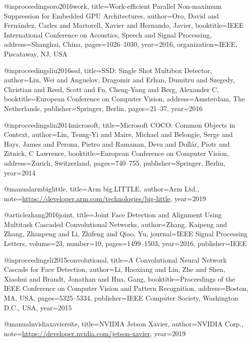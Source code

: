 
@inproceedings{oro2016work,
  title={{{Work-efficient Parallel Non-maximum Suppression for Embedded GPU Architectures}}},
  author={Oro, David and Fern{\'a}ndez, Carles and Martorell, Xavier and Hernando, Javier},
  booktitle={IEEE International Conference on Acoustics, Speech and Signal Processing},
  address={Shanghai, China},
  pages={1026--1030},
  year={2016},
  organization={IEEE, Piscataway, NJ, USA}
}

@inproceedings{liu2016ssd,
  title={{{SSD: Single Shot Multibox Detector}}},
  author={Liu, Wei and Anguelov, Dragomir and Erhan, Dumitru and Szegedy, Christian and Reed, Scott and Fu, Cheng-Yang and Berg, Alexander C},
  booktitle={European Conference on Computer Vision},
  address={Amsterdam, The Netherlands},
  publisher={Springer, Berlin},
  pages={21--37},
  year={2016}
}

@inproceedings{lin2014microsoft,
  title={{{Microsoft COCO: Common Objects in Context}}},
  author={Lin, Tsung-Yi and Maire, Michael and Belongie, Serge and Hays, James and Perona, Pietro and Ramanan, Deva and Doll{\'a}r, Piotr and Zitnick, C Lawrence},
  booktitle={European Conference on Computer Vision},
  address={Zurich, Switzerland},
  pages={740--755},
  publisher={Springer, Berlin},
  year={2014}
}

@manual{armbiglittle,
  title={{{Arm big.LITTLE}}},
  author={{Arm Ltd.}},
  note={\url{https://developer.arm.com/technologies/big-little}},
  year={2019}
}

@article{zhang2016joint,
  title={{{Joint Face Detection and Alignment Using Multitask Cascaded Convolutional Networks}}},
  author={Zhang, Kaipeng and Zhang, Zhanpeng and Li, Zhifeng and Qiao, Yu},
  journal={IEEE Signal Processing Letters},
  volume={23},
  number={10},
  pages={1499--1503},
  year={2016},
  publisher={IEEE}
}

@inproceedings{li2015convolutional,
  title={{{A Convolutional Neural Network Cascade for Face Detection}}},
  author={Li, Haoxiang and Lin, Zhe and Shen, Xiaohui and Brandt, Jonathan and Hua, Gang},
  booktitle={Proceedings of the IEEE Conference on Computer Vision and Pattern Recognition},
  address={Boston, MA, USA},
  pages={5325--5334},
  publisher={IEEE Computer Society, Washington D.C., USA},
  year={2015}
}

@manual{nvidiaxaviersite,
  title={{{NVIDIA Jetson Xavier}}},
  author={{NVIDIA Corp.}},
  note={\url{https://developer.nvidia.com/jetson-xavier}},
  year={2019}
}


